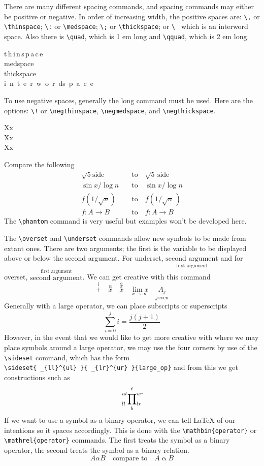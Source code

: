 \documentclass{amsart}
\begin{document}
	There are many different spacing commands, and spacing commands 
	may either be positive or negative. 
	In order of increasing width, the positive spaces are: 
	\verb+\,+ or \verb+\thinspace+; \verb+\:+ or \verb+\medspace+; 
	\verb+\;+ or \verb+\thickspace+; or \verb+\ + which is an 
	interword space. 
	Also there is \verb+\quad+, which is 1 em long and 
	\verb+\qquad+, which is 2 em long. \\
	\begin{center}
		t\,h\,i\,n\,s\,p\,a\,c\,e \\
		m\:e\:d\:s\:p\:a\:c\:e \\
		t\;h\;i\;c\;k\;s\;p\;a\;c\;e \\
		i\ n\ t\ e\ r\ w\ o\ r\ d\quad s\ p\ a\ c\ e
	\end{center}
	To use negative spaces, generally the long command must be used.
	Here are the options: \verb+\!+ or \verb+\negthinspace+, 
	\verb+\negmedspace+, and \verb+\negthickspace+. 
	\begin{center}
		X\!x \\
		X\negmedspace{}x \\
		X\negthickspace{}x
	\end{center}
	Compare the following
	\begin{align*}
		\sqrt{5} \text{side} \quad &\text{to} \quad \sqrt{5} \, \text{side} \\
		\sin x / \log n \quad 		&\text{to} \quad \sin x / \! \log n \\
		f(1 / \sqrt{n}) \quad 		&\text{to} \quad f(1 / \sqrt{n}\,) \\
		f: A \to B \quad 				&\text{to} \quad f \colon A \to B
	\end{align*}
	The \verb+\phantom+ command is very useful but examples won't be
	developed here. 

	The \verb+\overset+ and \verb+\underset+ commands allow new symbols
	to be made from extant ones. 
	There are two arguments; the first is the variable to be displayed
	above or below the second argument.
	For underset, $\underset{\text{first argument}}{\text{second argument}}$ 
	and for overset, $\overset{\text{first argument}}{\text{second argument}}$.
	We can get creative with this command
	\[
		\overset{l}{+} 	\quad
		\overset{\alpha}{x} \quad
		\overset{\overset{\alpha}{x}}{x} \quad
		\underset{x \to \infty}{\lim x} \quad
		\underset{j \, \text{even}}{A_j}
	\] 
	Generally with a large operator, we can place subscripts or 
	superscripts
	\[
		\sum_{i = 0}^j i = \frac{j(j+1)}{2}
	\]
	However, in the event that we would like to get more creative with 
	where we may place symbols around a large operator, we may use
	the four corners by use of the \verb+\sideset+ command, which
	has the form \\
	\verb+\sideset{ _{ll}^{ul} }{ _{lr}^{ur} }{large_op}+
	and from this we get constructions such as 
	\[
		\sideset{ _{ll}^{ul} }{ _{lr}^{ur} }{\prod}_b^t
	\]
	If we want to use a symbol as a binary operator, we can tell
	\LaTeX{} of our intentions so it spaces accordingly. 
	This is done with the 
	\verb+\mathbin{operator}+ or \verb+\mathrel{operator}+ commands. 
	The first treats the symbol as a binary operator, the second
	treats the symbol as a binary relation. 
	\[
		A \alpha B \quad \text{compare to} \quad A \mathbin{\alpha} B
	\]
	
\end{document}
